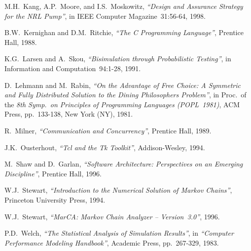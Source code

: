 \begin{thebibliography}{00}
 M.H.~Kang, A.P.~Moore, and I.S.~Moskowitz,
{\it ``Design and Assurance Strategy for the NRL Pump''},
in IEEE Computer Magazine~31:56-64, 1998.

 B.W.~Kernighan and D.M.~Ritchie,
{\it ``The C Programming Language''},
Prentice Hall, 1988.

 K.G.~Larsen and A.~Skou,
{\it ``Bisimulation through Probabilistic Testing''},
in Information and Computation~94:1-28, 1991.

 D.~Lehmann and M.~Rabin,
{\it ``On the Advantage of Free Choice: A Symmetric and Fully Distributed Solution to the Dining
Philosophers Problem''},
in Proc.\ of the {\it 8th Symp.\ on Principles of Programming Languages (POPL~1981)},
ACM Press, pp.~133-138,
New York (NY), 1981.

 R.~Milner,
{\it ``Communication and Concurrency''},
Prentice Hall, 1989.

 J.K.~Ousterhout,
{\it ``Tcl and the Tk Toolkit''},
Addison-Wesley, 1994.

 M.~Shaw and D.~Garlan,
{\it ``Software Architecture: Perspectives on an Emerging Discipline''},
Prentice Hall, 1996.

 W.J.~Stewart,
{\it ``Introduction to the Numerical Solution of Markov Chains''},
Princeton University Press, 1994.

 W.J.~Stewart,
{\it ``MarCA: Markov Chain Analyzer -- Version~3.0''},
1996.

 P.D.~Welch,
{\it ``The Statistical Analysis of Simulation Results''},
in {\it ``Computer Performance Modeling Handbook''},
Academic Press, pp.~267-329, 1983.

\end{thebibliography}

